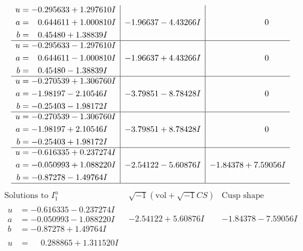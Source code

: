 \documentclass[1p]{elsarticle_modified}
\theoremstyle{definition}
\newcommand{\I}{\sqrt{-1}}
\begin{document}
$$\begin{array}{c|c|c}
\begin{aligned}
u &= -0.295633 + 1.297610 I \\
a &= \phantom{-}0.644611 + 1.000810 I \\
b &= \phantom{-}0.45480 + 1.38839 I\end{aligned}
 & -1.96637 - 4.43266 I & \phantom{-0.000000 } 0 \\ \hline\begin{aligned}
u &= -0.295633 - 1.297610 I \\
a &= \phantom{-}0.644611 - 1.000810 I \\
b &= \phantom{-}0.45480 - 1.38839 I\end{aligned}
 & -1.96637 + 4.43266 I & \phantom{-0.000000 } 0 \\ \hline\begin{aligned}
u &= -0.270539 + 1.306760 I \\
a &= -1.98197 - 2.10546 I \\
b &= -0.25403 - 1.98172 I\end{aligned}
 & -3.79851 - 8.78428 I & \phantom{-0.000000 } 0 \\ \hline\begin{aligned}
u &= -0.270539 - 1.306760 I \\
a &= -1.98197 + 2.10546 I \\
b &= -0.25403 + 1.98172 I\end{aligned}
 & -3.79851 + 8.78428 I & \phantom{-0.000000 } 0 \\ \hline\begin{aligned}
u &= -0.616335 + 0.237274 I \\
a &= -0.050993 + 1.088220 I \\
b &= -0.87278 - 1.49764 I\end{aligned}
 & -2.54122 - 5.60876 I & -1.84378 + 7.59056 I\\
 \hline 
 \end{array}$$\newpage$$\begin{array}{c|c|c}  
\text{Solutions to }I^u_{1}& \I (\text{vol} + \sqrt{-1}CS) & \text{Cusp shape}\\
 \hline 
\begin{aligned}
u &= -0.616335 - 0.237274 I \\
a &= -0.050993 - 1.088220 I \\
b &= -0.87278 + 1.49764 I\end{aligned}
 & -2.54122 + 5.60876 I & -1.84378 - 7.59056 I \\ \hline\begin{aligned}
u &= \phantom{-}0.288865 + 1.311520 I \\

\end{aligned}
\end{array}$$
\end{document}
